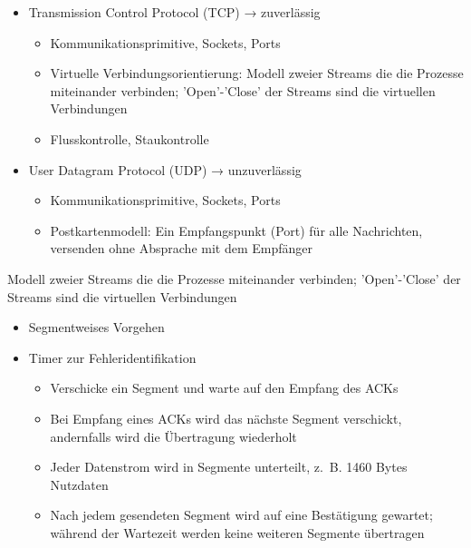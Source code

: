 
\begin{itemize}
    \item Transmission Control Protocol (TCP) → zuverlässig
    \begin{itemize}
        \item Kommunikationsprimitive, Sockets, Ports
        \item Virtuelle Verbindungsorientierung: Modell zweier Streams die die Prozesse miteinander verbinden;
        'Open'-'Close' der Streams sind die virtuellen Verbindungen
        \item Flusskontrolle, Staukontrolle
    \end{itemize}
    \item User Datagram Protocol (UDP) → unzuverlässig
    \begin{itemize}
        \item Kommunikationsprimitive, Sockets, Ports
        \item Postkartenmodell: Ein Empfangspunkt (Port) für alle Nachrichten, versenden ohne Absprache mit dem Empfänger
    \end{itemize}
\end{itemize}

Modell zweier Streams die die Prozesse miteinander verbinden;
'Open'-'Close' der Streams sind die virtuellen Verbindungen

\begin{itemize}
    \item Segmentweises Vorgehen
    \item Timer zur Fehleridentifikation
    \begin{itemize}
        \item Verschicke ein Segment und warte auf den Empfang des ACKs
        \item Bei Empfang eines ACKs wird das nächste Segment verschickt, andernfalls wird die Übertragung wiederholt
        \item Jeder Datenstrom wird in Segmente unterteilt, z.\ B. 1460 Bytes Nutzdaten
        \item Nach jedem gesendeten Segment wird auf eine Bestätigung gewartet;
        während der Wartezeit werden keine weiteren Segmente übertragen
    \end{itemize}
\end{itemize}

